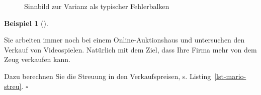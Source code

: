 \documentclass[
  letterpaper,
]{scrbook}
\theoremstyle{definition}
\newtheorem{example}{Beispiel}[chapter]
\theoremstyle{definition}
\theoremstyle{definition}
\theoremstyle{remark}
\begin{document}
\begin{figure}

\begin{minipage}{0.50\linewidth}



\end{minipage}%
%
\begin{minipage}{0.50\linewidth}



\end{minipage}%

\caption{\label{fig-mse}Sinnbild zur Varianz als typischer Fehlerbalken}

\end{figure}%

\begin{example}[]\protect\hypertarget{exm-var}{}\label{exm-var}

Sie arbeiten immer noch bei einem Online-Auktionshaus und untersuchen
den Verkauf von Videospielen. Natürlich mit dem Ziel, dass Ihre Firma
mehr von dem Zeug verkaufen kann.

Dazu berechnen Sie die Streuung in den Verkaufspreisen, s.
Listing~\ref{lst-mario-streu}. \(\square\)

\end{example}
\end{document}

